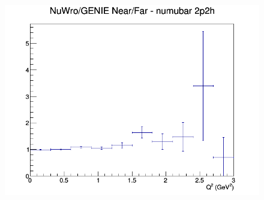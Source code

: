 \documentclass[12pt]{article}
\begin{document}
\begin{figure}[h]
\endminipage
{}
\includegraphics[width=\linewidth]{Q2/nominal/ratios/2p2h_NuWro_GENIE_numubar_NF_Q2.png}
\endminipage
\newline
\end{figure}
\clearpage
\end{document}
